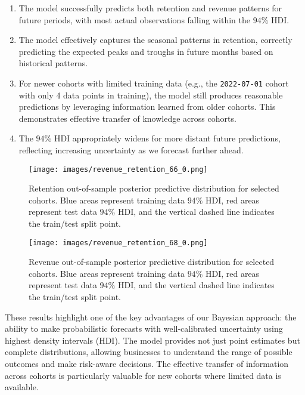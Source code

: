 \documentclass[11pt]{amsart}
\theoremstyle{definition}
\begin{document}
\begin{enumerate}
    \item The model successfully predicts both retention and revenue patterns for future periods, with most actual
          observations falling within the $94\%$ HDI.

    \item The model effectively captures the seasonal patterns in retention, correctly predicting the expected peaks and
          troughs in future months based on historical patterns.

    \item For newer cohorts with limited training data (e.g., the \texttt{2022-07-01} cohort with only 4 data points in
          training), the model still produces reasonable predictions by leveraging information learned from older cohorts.
          This demonstrates effective transfer of knowledge across cohorts.

    \item The $94\%$ HDI appropriately widens for more distant future predictions, reflecting increasing uncertainty as we
          forecast further ahead.
\end{enumerate}

\begin{figure}
    \centering
    \texttt{[image: images/revenue\_retention\_66\_0.png]}
    \caption{Retention out-of-sample posterior predictive distribution for selected cohorts. Blue areas represent training
        data $94\%$ HDI, red areas represent test data $94\%$ HDI, and the vertical dashed line indicates the train/test
        split point.}
    \label{fig:out_sample_retention}
\end{figure}

\begin{figure}
    \centering
    \texttt{[image: images/revenue\_retention\_68\_0.png]}
    \caption{Revenue out-of-sample posterior predictive distribution for selected cohorts. Blue areas represent training
        data $94\%$ HDI, red areas represent test data $94\%$ HDI, and the vertical dashed line indicates the train/test
        split point.}
    \label{fig:out_sample_revenue}
\end{figure}

These results highlight one of the key advantages of our Bayesian approach: the ability to make probabilistic forecasts with
well-calibrated uncertainty using highest density intervals (HDI). The model provides not just point estimates but complete
distributions, allowing businesses to understand the range of possible outcomes and make risk-aware decisions. The effective
transfer of information across cohorts is particularly valuable for new cohorts where limited data is available.
\end{document}
